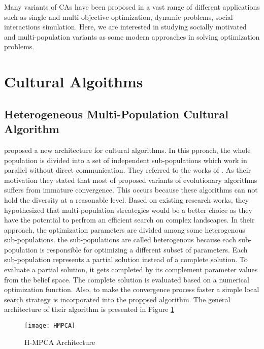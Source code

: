 \label{chapter:problem}

\newlength{\savedunitlength}
\setlength{\unitlength}{2em}

Many variants of CAs have been proposed in a vast range of different applications such as single and multi-objective optimization, dynamic problems, social interactions simulation. Here, we are interested in studying socially motivated and multi-population variants as some modern approaches in solving optimization problems.
\section{Cultural Algoithms}
\subsection{Heterogeneous Multi-Population Cultural Algorithm}
\cite{kobti2013heterogeneous} proposed a new architecture for cultural algorithms. In this pproach, the whole population is divided into a set of independent sub-populations which work in parallel without direct communication. They referred to the works of \cite{xu2010novel} \cite{guo2011novel} \cite{vasile2011inflationary} \cite{sharma2011reserve}. As their motivation they stated that most of proposed variants of evolutionary algorithms suffers from immature convergence. This occurs because these algorithms can not hold the diversity at a reasonable level. Based on existing research works, they hypothesized that multi-population streategies would be a better choice as they have the potential to perfrom an efficient search on complex landscapes. In their approach, the optimization parameters are divided among some heterogenous sub-populations. the sub-populations are called heterogenous because each sub-population is responsible for optimizing a different subset of parameters. Each sub-population represents a partial solution instead of a complete solution. To evaluate a partial solution, it gets completed by its complement parameter values from the belief space. The complete solution is evaluated based on a numerical optimization function. Also, to make the convergence process faster a simple local search strategy is incorporated into the proppsed algorithm. The general architecture of their algorithm is presented in Figure \ref{fig:HPMCA} \newline
\begin{figure}[h]
	\texttt{[image: HMPCA]}
	\centering
	\caption{H-MPCA Architecture \cite{kobti2013heterogeneous}}
	\label{fig:HPMCA}
\end{figure}
